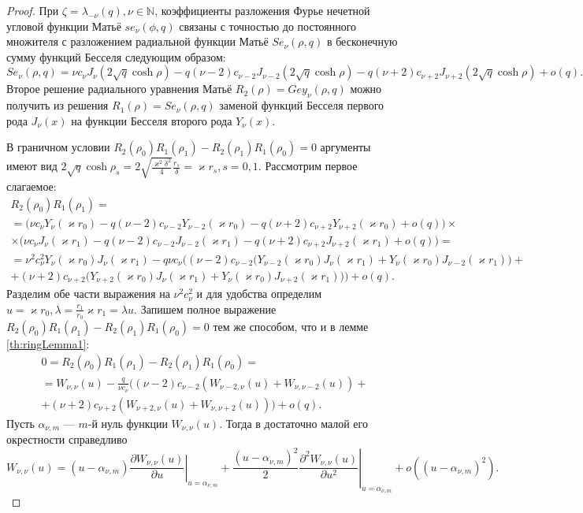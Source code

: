 \begin{proof}
При $\zeta = \lambda_{-\nu}(q), \nu \in \mathbb{N}$, коэффициенты разложения Фурье нечетной угловой функции Матьё $se_\nu(\phi, q)$ связаны \cite{wref2} с точностью до постоянного множителя с разложением радиальной функции Матьё $Se_\nu(\rho, q)$ в бесконечную сумму функций Бесселя следующим образом:
{\small
\[
Se_\nu(\rho, q) = 
	\nu c_\nu J_\nu(2\sqrt{q}\cosh{\rho})  -
	q (\nu-2) c_{\nu-2} J_{\nu-2}(2\sqrt{q}\cosh{\rho}) - 
	q (\nu+2) c_{\nu+2} J_{\nu+2}(2\sqrt{q}\cosh{\rho}) + o(q).
\]
}
Второе решение радиального уравнения Матьё $R_2(\rho)=Gey_\nu(\rho, q)$ можно получить из решения $R_1(\rho)=Se_\nu(\rho, q)$ заменой функций Бесселя первого рода $J_\nu(x)$ на функции Бесселя второго рода $Y_\nu(x)$.

В граничном условии $R_2(\rho_0) R_1(\rho_1) - R_2(\rho_1) R_1(\rho_0) = 0$ аргументы имеют вид $2 \sqrt{q} \cosh{\rho_s} = 2 \sqrt{\frac{\varkappa^2 \delta^2}{4}} \frac{r_s}{\delta} = \varkappa r_s, s=0,1$. Рассмотрим первое слагаемое:
{\small
\begin{multline*}
	R_2(\rho_0) R_1(\rho_1) = \\
=\big(
\nu c_\nu Y_\nu(\varkappa r_0) - 
	q (\nu-2) c_{\nu-2} Y_{\nu-2}(\varkappa r_0) -
	q (\nu+2) c_{\nu+2} Y_{\nu+2}(\varkappa r_0) + o(q)
\big) \times \\
\times \big(
\nu c_\nu J_\nu(\varkappa r_1) - 
	q (\nu-2) c_{\nu-2} J_{\nu-2}(\varkappa r_1) -
	q (\nu+2) c_{\nu+2} J_{\nu+2}(\varkappa r_1) + o(q)
\big) = \\
= \nu^2 c_\nu^2 Y_\nu(\varkappa r_0)J_\nu(\varkappa r_1) - 
	q \nu c_\nu \bigg(   (\nu-2) c_{\nu-2} 
	\big(
	Y_{\nu-2}(\varkappa r_0)J_\nu(\varkappa r_1) +  Y_{\nu}(\varkappa r_0)J_{\nu-2}(\varkappa r_1)
	\big) +
	\\ +
	 (\nu+2) c_{\nu+2} 
	\big(
	Y_{\nu+2}(\varkappa r_0)J_\nu(\varkappa r_1) + Y_{\nu}(\varkappa r_0)J_{\nu+2}(\varkappa r_1)
	\big)
\bigg) + o(q).
\end{multline*}
}
Разделим обе части выражения на $\nu^2 c_\nu^2$ и для удобства определим $u = \varkappa r_0, \lambda = \frac{r_1}{r_0}  \varkappa r_1 = \lambda u$. Запишем полное выражение $R_2(\rho_0) R_1(\rho_1) - R_2(\rho_1) R_1(\rho_0) = 0$ тем же способом, что и в лемме \ref{th:ringLemma1}:
\begin{multline}
	0 = R_2(\rho_0) R_1(\rho_1) - R_2(\rho_1) R_1(\rho_0)  = \\
= W_{\nu, \nu}(u) - 
	\frac{q}{\nu c_\nu} \bigg(   (\nu-2) c_{\nu-2}
	\left(
	W_{\nu-2, \nu}(u) + W_{\nu, \nu-2}(u)
	\right)+ \\
	  + (\nu+2) c_{\nu+2}
	\left(
	W_{\nu+2, \nu}(u) + W_{\nu, \nu+2}(u)
	\right)
\bigg) + o(q).
\label{eq:35}
\end{multline}
Пусть $\alpha_{\nu, m}$ --- $m$-й нуль функции $W_{\nu, \nu}(u)$. Тогда в достаточно малой его окрестности справедливо
$$
W_{\nu, \nu}(u) = (u - \alpha_{\nu, m}) \left.
\frac{\partial W_{\nu, \nu}(u)}{\partial u}
\right|_{u=\alpha_{\nu, m}} + 
\frac{ (u - \alpha_{\nu, m})^2 }{2} \left.
\frac{\partial^2 W_{\nu, \nu}(u)}{\partial u^2}
\right|_{u=\alpha_{\nu, m}} + o((u - \alpha_{\nu, m})^2).
$$


\end{proof}
